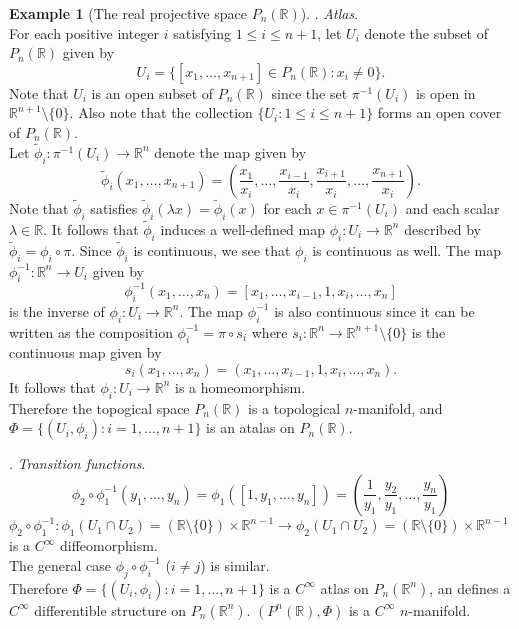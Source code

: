 \documentclass{amsart}
\numberwithin{equation}{section}
\newcommand{\bR}{\mathbb{R}}
\theoremstyle{definition}
\newtheorem{example}[definition]{Example}
\theoremstyle{theorem}
\begin{document}
\begin{example}[{The real projective space $P_n(\bR)$}]
. {\em Atlas}.\\
For each positive integer $i$ satisfying $1 \le i \le n+1$, let $U_i$ denote the subset of $P_n(\bR)$ given by 
\[
U_i = \{[x_1, \ldots, x_{n+1}]\in P_n(\bR) : x_i \ne 0 \}.
\]
Note that $U_i$ is an open subset of $P_n(\bR)$ since the set $\pi^{-1}(U_i)$ is open in $\mathbb{R}^{n+1}\setminus\{0\}$. Also note that the collection $\{U_i : 1 \le i \le n+1\}$ forms an open cover of $P_n(\bR)$. \\
Let $\widetilde{\phi}_i : \pi^{-1}(U_i) \to \bR^n$ denote the map given by 
\[
\widetilde{\phi}_i(x_1, \ldots, x_{n+1}) = \left(\frac{x_1}{x_i}, \ldots, \frac{x_{i-1}}{x_i}, \frac{x_{i+1}}{x_i}, \ldots, \frac{x_{n+1}}{x_i}\right).
\] 
Note that $\widetilde{\phi}_i$ satisfies $\widetilde{\phi}_i(\lambda x) = \widetilde{\phi}_i(x)$ for each $x \in \pi^{-1}(U_i)$ and each scalar $\lambda \in \mathbb{R}$. It follows that $\widetilde{\phi}_i$ induces a well-defined map $\phi_i : U_i \to \mathbb{R}^n$ described by $\widetilde{\phi}_i = \phi_i \circ \pi$. Since $\widetilde{\phi}_i$ is continuous, we see that $\phi_i$ is continuous as well. The map
$\phi_i^{-1}: \bR^n\to U_i$  given by 
$$
\phi_i^{-1}(x_1, \ldots, x_n) = [x_1, \ldots, x_{i-1}, 1, x_{i}, \ldots, x_n]
$$
is the inverse of $\phi_i: U_i\to \bR^n$. 
The map $\phi_i^{-1}$ is also continuous since it can be written as the composition $\phi_i^{-1} = \pi \circ s_i$ where $s_i : \bR^n \to \mathbb{R}^{n+1}\setminus  \{0\}$ is the continuous map given by 
\[
s_i(x_1, \ldots, x_n) = (x_1, \ldots, x_{i-1}, 1, x_i, \ldots, x_n).
\]
It follows that $\phi_i : U_i \to \mathbb{R}^n$ is a homeomorphism. \\
Therefore the topogical space $P_n(\bR)$ is a topological $n$-manifold,
and $\Phi=\{ (U_i,\phi_i): i=1,\ldots,n+1\}$ is an atalas on $P_n(\bR)$.

\smallskip

. {\em Transition functions}.
$$
\phi_2\circ \phi_1^{-1}(y_1,\ldots, y_n)
=\phi_1([1,y_1,\ldots, y_n])
=(\frac{1}{y_1},\frac{y_2}{y_1},\ldots, \frac{y_n}{y_1})
$$
$\phi_2\circ \phi_1^{-1}:
\phi_1(U_1\cap U_2)= (\bR\setminus\{0\})\times \bR^{n-1}
\to \phi_2(U_1\cap U_2)= (\bR\setminus\{0\})\times \bR^{n-1}$
is a $C^\infty$ diffeomorphism. \\
The general case $\phi_j\circ \phi_i^{-1}$ ($i\neq j$) is similar. \\
Therefore $\Phi=\{(U_i,\phi_i):i=1,\ldots,n+1\}$ is 
a $C^\infty$ atlas on $P_n(\bR^n)$, an defines a $C^\infty$ differentible
structure on $P_n(\bR^n)$. $(P^n(\bR),\Phi)$ is a $C^\infty$ $n$-manifold.
\end{example}
\end{document}
